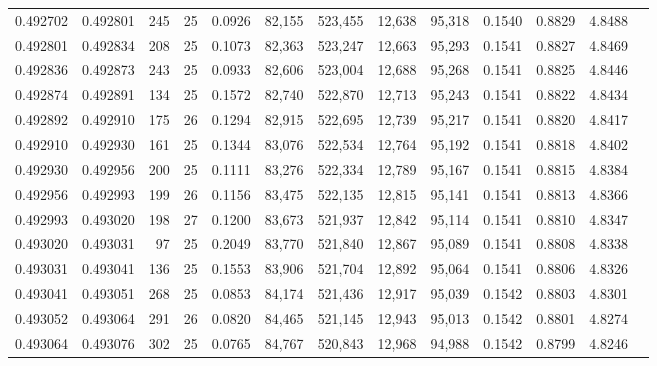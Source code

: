\begin{tabular}{rrrrrrrrrrrrr}
0.492702 & 0.492801 & 245 &  25 &                                     0.0926 &  82,155 & 523,455 &  12,638 &  95,318 & 0.1540 & 0.8829 & 4.8488 \\
0.492801 & 0.492834 & 208 &  25 &                                     0.1073 &  82,363 & 523,247 &  12,663 &  95,293 & 0.1541 & 0.8827 & 4.8469 \\
0.492836 & 0.492873 & 243 &  25 &                                     0.0933 &  82,606 & 523,004 &  12,688 &  95,268 & 0.1541 & 0.8825 & 4.8446 \\
0.492874 & 0.492891 & 134 &  25 &                                     0.1572 &  82,740 & 522,870 &  12,713 &  95,243 & 0.1541 & 0.8822 & 4.8434 \\
0.492892 & 0.492910 & 175 &  26 &                                     0.1294 &  82,915 & 522,695 &  12,739 &  95,217 & 0.1541 & 0.8820 & 4.8417 \\
0.492910 & 0.492930 & 161 &  25 &                                     0.1344 &  83,076 & 522,534 &  12,764 &  95,192 & 0.1541 & 0.8818 & 4.8402 \\
0.492930 & 0.492956 & 200 &  25 &                                     0.1111 &  83,276 & 522,334 &  12,789 &  95,167 & 0.1541 & 0.8815 & 4.8384 \\
0.492956 & 0.492993 & 199 &  26 &                                     0.1156 &  83,475 & 522,135 &  12,815 &  95,141 & 0.1541 & 0.8813 & 4.8366 \\
0.492993 & 0.493020 & 198 &  27 &                                     0.1200 &  83,673 & 521,937 &  12,842 &  95,114 & 0.1541 & 0.8810 & 4.8347 \\
0.493020 & 0.493031 &  97 &  25 &                                     0.2049 &  83,770 & 521,840 &  12,867 &  95,089 & 0.1541 & 0.8808 & 4.8338 \\
0.493031 & 0.493041 & 136 &  25 &                                     0.1553 &  83,906 & 521,704 &  12,892 &  95,064 & 0.1541 & 0.8806 & 4.8326 \\
0.493041 & 0.493051 & 268 &  25 &                                     0.0853 &  84,174 & 521,436 &  12,917 &  95,039 & 0.1542 & 0.8803 & 4.8301 \\
0.493052 & 0.493064 & 291 &  26 &                                     0.0820 &  84,465 & 521,145 &  12,943 &  95,013 & 0.1542 & 0.8801 & 4.8274 \\
0.493064 & 0.493076 & 302 &  25 &                                     0.0765 &  84,767 & 520,843 &  12,968 &  94,988 & 0.1542 & 0.8799 & 4.8246 \\

\end{tabular}
